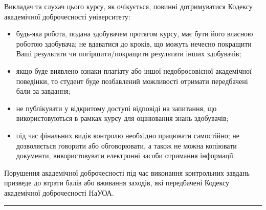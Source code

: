 \documentclass[
  letterpaper,
  DIV=11,
  numbers=noendperiod]{scrreprt}
\begin{document}
Викладач та слухач цього курсу, як очікується, повинні дотримуватися
Кодексу академічної доброчесності університету:

\begin{itemize}
\item
  будь-яка робота, подана здобувачем протягом курсу, має бути його
  власною роботою здобувача; не вдаватися до кроків, що можуть нечесно
  покращити Ваші результати чи погіршити/покращити результати інших
  здобувачів;
\item
  якщо буде виявлено ознаки плагіату або іншої недобросовісної
  академічної поведінки, то студент буде позбавлений можливості отримати
  передбачені бали за завдання;
\item
  не публікувати у відкритому доступі відповіді на запитання, що
  використовуються в рамках курсу для оцінювання знань здобувачів;
\item
  під час фінальних видів контролю необхідно працювати самостійно; не
  дозволяється говорити або обговорювати, а також не можна копіювати
  документи, використовувати електронні засоби отримання інформації.
\end{itemize}

Порушення академічної доброчесності під час виконання контрольних
завдань призведе до втрати балів або вживання заходів, які передбачені
Кодексу академічної доброчесності НаУОА.

\begin{center}\rule{0.5\linewidth}{0.5pt}\end{center}
\end{document}
